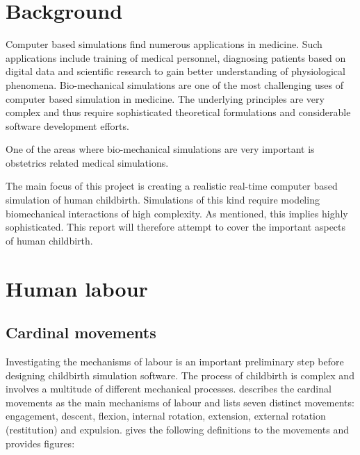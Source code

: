 \section{Background}\label{intro-background}

Computer based simulations find numerous applications in medicine. Such applications include training of medical personnel, diagnosing patients based on digital data and scientific research to gain better understanding of physiological phenomena. Bio-mechanical simulations are one of the most challenging uses of computer based simulation in medicine. The underlying principles are very complex and thus require sophisticated theoretical formulations and considerable software development efforts.

One of the areas where bio-mechanical simulations are very important is obstetrics related medical simulations.

The main focus of this project is creating a realistic real-time computer based simulation of human childbirth. Simulations of this kind require modeling biomechanical interactions of high complexity. As mentioned, this implies highly sophisticated. This report will therefore attempt to cover the important aspects of human childbirth.

\section{Human labour}
\subsection{Cardinal movements}
Investigating the mechanisms of labour is an important preliminary step before designing childbirth simulation software. The process of childbirth is complex and involves a multitude of different mechanical processes. \citet{GABBE91} describes the cardinal movements as the main mechanisms of labour and lists seven distinct movements: engagement, descent, flexion, internal rotation, extension, external rotation (restitution) and expulsion. \citet{NORMALLABOUR} gives the following definitions to the movements and provides figures:

